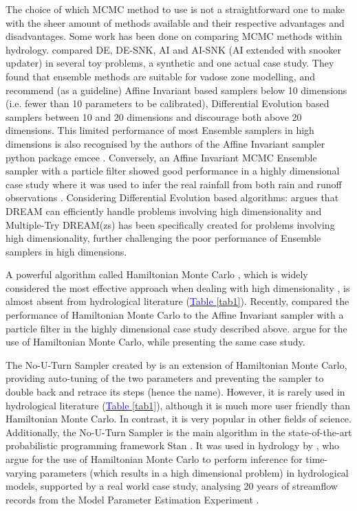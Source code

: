 The choice of which MCMC method to use is not a straightforward one to make with the sheer amount of methods available and their respective advantages and disadvantages. Some work has been done on comparing MCMC methods within hydrology. \cite{brunetti2023depth} compared DE, DE-SNK, AI and AI-SNK (AI extended with snooker updater) in several toy problems, a synthetic and one actual case study. They found that ensemble methods are suitable for vadose zone modelling, and recommend (as a guideline) Affine Invariant based samplers below 10 dimensions (i.e. fewer than 10 parameters to be calibrated), Differential Evolution based samplers between 10 and 20 dimensions and discourage both above 20 dimensions. This limited performance of most Ensemble samplers in high dimensions is also recognised by the authors of the Affine Invariant sampler python package emcee \citep{hogg2018data}. Conversely, an Affine Invariant MCMC Ensemble sampler with a particle filter showed good performance in a highly dimensional case study where it was used to infer the real rainfall from both rain and runoff observations \citep{bacci2023comparison}.  Considering Differential Evolution based algorithms: \cite{vrugt2009accelerating} argues that DREAM can efficiently handle problems involving high dimensionality and Multiple-Try DREAM(zs) \citep{laloy2012high} has been specifically created for problems involving high dimensionality, further challenging the poor performance of Ensemble samplers in high dimensions. 

A powerful algorithm called Hamiltonian Monte Carlo \citep{duane1987hybrid}, which is widely considered the most effective approach when dealing with high dimensionality \citep{hogg2018data}, is almost absent from hydrological literature (\hyperref[tab1]{\textcolor{blue}{Table} \ref*{tab1}}). Recently, \cite{bacci2023comparison} compared the performance of Hamiltonian Monte Carlo to the Affine Invariant sampler with a particle filter in the highly dimensional case study described above. \cite{ulzega2023bayesian} argue for the use of Hamiltonian Monte Carlo, while presenting the same case study. 

The No-U-Turn Sampler created by \cite{hoffman2014no} is an extension of Hamiltonian Monte Carlo, providing auto-tuning of the two parameters and preventing the sampler to double back and retrace its steps (hence the name). However, it is rarely used in hydrological literature (\hyperref[tab1]{\textcolor{blue}{Table} \ref*{tab1}}), although it is much more user friendly than Hamiltonian Monte Carlo. In contrast, it is very popular in other fields of science. Additionally, the No-U-Turn Sampler is the main algorithm in the state-of-the-art probabilistic programming framework Stan \citep{carpenter2017stan}. It was used in hydrology by \cite{krapu2022differentiable}, who argue for the use of Hamiltonian Monte Carlo to perform inference for time-varying parameters (which results in a high dimensional problem) in hydrological models, supported by a real world case study, analysing 20 years of streamflow records from the Model Parameter Estimation Experiment \citep{duan2006model}. 

